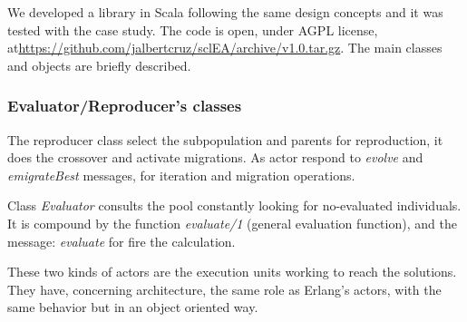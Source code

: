 
We developed a library in Scala following the same design concepts and it was tested with the case study. The code is open, under AGPL license, at\url{https://github.com/jalbertcruz/sclEA/archive/v1.0.tar.gz}. The main classes and objects are briefly described.

\subsubsection{Evaluator/Reproducer's classes}

The reproducer class select the subpopulation and parents for reproduction, it does the crossover and activate migrations. As actor respond to {\em evolve} and {\em emigrateBest} messages, for iteration and migration operations.

Class {\em Evaluator} consults the pool constantly looking for no-evaluated individuals. It is compound by the function {\em evaluate/1} (general evaluation function), and the message: {\em evaluate} for fire the calculation.

These two kinds of actors are the execution units working to reach the solutions. They have, concerning architecture, the same role as Erlang’s actors, with the same behavior but in an object oriented way.
